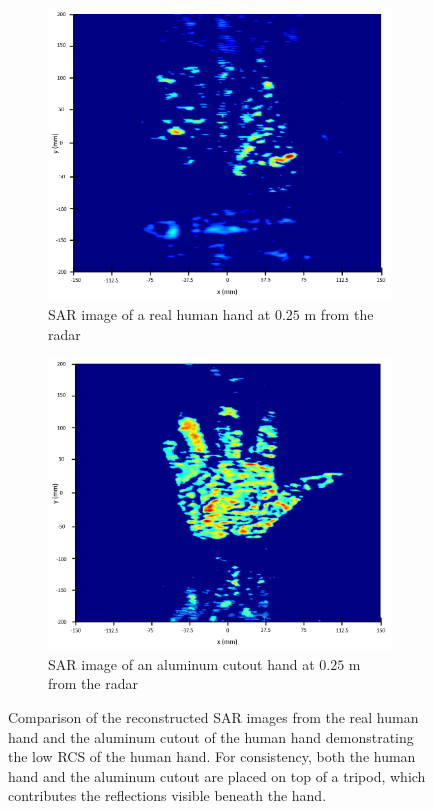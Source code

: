 \documentclass{ieeeaccess}
\begin{document}
\begin{figure}
     \centering
     \begin{subfigure}[b]{0.23\textwidth}
         \centering
         \includegraphics[width=\textwidth]{smith7.png}
         \caption{SAR image of a real human hand at $0.25$ m from the radar}
         \label{fig:sar_real_hand}
     \end{subfigure}
     \hfill
     \begin{subfigure}[b]{0.23\textwidth}
         \centering
         \includegraphics[width=\textwidth]{smith8.png}
         \caption{SAR image of an aluminum cutout hand at $0.25$ m from the radar}
         \label{fig:sar_foil_hand}
     \end{subfigure}
        \caption{Comparison of the reconstructed SAR images from the real human hand and the aluminum cutout of the human hand demonstrating the low RCS of the human hand. For consistency, both the human hand and the aluminum cutout are placed on top of a tripod, which contributes the reflections visible beneath the hand.}
        \label{fig:sar_images}
\end{figure}
\end{document}
